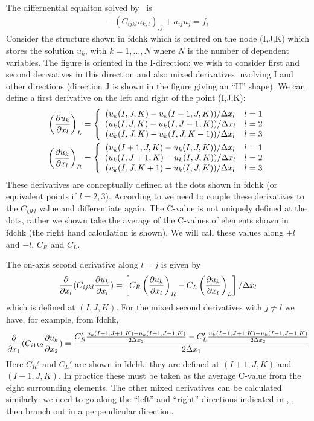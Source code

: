 \documentclass[a4paper]{article}
\begin{document}
The differnential equaiton solved by \zinc\ is
\begin{eqnarray}
  -(C_{ijkl}u_{k,l})_{,j}+a_{ij}u_j=f_i
\label{fdeq}
\end{eqnarray}
Consider the structure shown in \f{fdchk} which is centred on the node
(I,J,K) which stores the solution $u_k$, with $k=1,\ldots,N$ where $N$
is the number of dependent variables. The figure is oriented in the
I-direction: we wish to consider first and second derivatives in this
direction and also mixed derivatives involving I and other directions
(direction J is shown in the figure giving an ``H'' shape). We can
define a first derivative on the left and right of the point (I,J,K):
\begin{eqnarray}
  \left(\frac{\partial u_k}{\partial x_l}\right)_L
  =\left\{
  \begin{array}{cc}
    (u_k(I,J,K)-u_k(I-1,J,K))/\Delta x_l & l=1\\
    (u_k(I,J,K)-u_k(I,J-1,K))/\Delta x_l & l=2\\
    (u_k(I,J,K)-u_k(I,J,K-1))/\Delta x_l & l=3
  \end{array}\right.\label{fdleft}\\
  \left(\frac{\partial u_k}{\partial x_l}\right)_R
  =\left\{
  \begin{array}{cc}
    (u_k(I+1,J,K)-u_k(I,J,K))/\Delta x_l & l=1\\
    (u_k(I,J+1,K)-u_k(I,J,K))/\Delta x_l & l=2\\
    (u_k(I,J,K+1)-u_k(I,J,K))/\Delta x_l & l=3
  \end{array}\right.\label{fdright}
\end{eqnarray}
These derivatives are conceptually defined at the dots shown in \f{fdchk} (or
equivalent points if $l=2,3$). According to  we need to couple these
derivatives to the $C_{ijkl}$ value and differentiate again. The
C-value is not uniquely defined at the dots, rather we shown take the
average of the C-values of elements shown in \f{fdchk} (the right hand
calculation is shown). We will call these values along $+l$ and $-l$, $C_R$ and $C_L$.

The on-axis second derivative along $l=j$ is given by
\begin{eqnarray}
  \frac{\partial}{\partial x_l}(C_{ijkl}\frac{\partial u_k}{\partial x_l})=
  \left[ C_R\left(\frac{\partial u_k}{\partial x_l}\right)_R-C_L\left(\frac{\partial u_k}{\partial x_l}\right)_L\right]/\Delta x_l
\end{eqnarray}
which is defined at $(I,J,K)$. For the mixed second derivatives with $j\ne l$ we have, for example, from \f{fdchk},
\begin{eqnarray}
  \frac{\partial}{\partial x_1}(C_{i1k2}\frac{\partial u_k}{\partial x_2})=
\frac{C_R'\frac{u_k(I+1,J+1,K)-u_k(I+1,J-1,K)}{2\Delta x_2}-C_L'\frac{u_k(I-1,J+1,K)-u_k(I-1,J-1,K)}{2\Delta x_2}}
{2\Delta x_1}
\end{eqnarray}
Here $C_R'$ and $C_L'$ are shown in \f{fdchk}: they are defined at
$(I+1,J,K)$ and $(I-1,J,K)$. In practice these must be taken as the
average C-value from the eight surrounding elements. The other mixed
derivatives can be calculated similarly: we need to go along the ``left''
and ``right'' directions indicated in , , then branch out in a
perpendicular direction.
\end{document}
